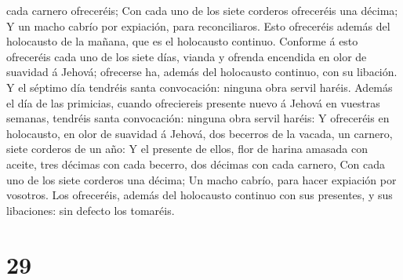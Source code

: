 cada carnero ofreceréis;  Con cada uno de los siete
corderos ofreceréis una décima;  Y un macho cabrío por
expiación, para reconciliaros.  Esto ofreceréis además del
holocausto de la mañana, que es el holocausto continuo. 
Conforme á esto ofreceréis cada uno de los siete días, vianda y ofrenda
encendida en olor de suavidad á Jehová; ofrecerse ha, además del
holocausto continuo, con su libación.  Y el séptimo día
tendréis santa convocación: ninguna obra servil haréis. 
Además el día de las primicias, cuando ofreciereis presente nuevo á
Jehová en vuestras semanas, tendréis santa convocación: ninguna obra
servil haréis:  Y ofreceréis en holocausto, en olor de
suavidad á Jehová, dos becerros de la vacada, un carnero, siete corderos
de un año:  Y el presente de ellos, flor de harina amasada
con aceite, tres décimas con cada becerro, dos décimas con cada carnero,
 Con cada uno de los siete corderos una décima;
 Un macho cabrío, para hacer expiación por vosotros.
 Los ofreceréis, además del holocausto continuo con sus
presentes, y sus libaciones: sin defecto los tomaréis.

\hypertarget{section-28}{%
\section{29}\label{section-28}}

